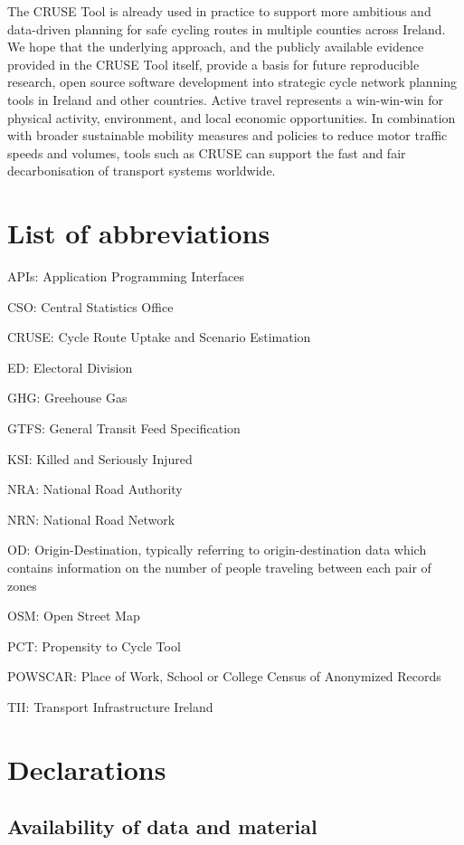 \documentclass[
  super,
  preprint,
  3p]{elsarticle}
\begin{document}
The CRUSE Tool is already used in practice to support more ambitious and
data-driven planning for safe cycling routes in multiple counties across
Ireland. We hope that the underlying approach, and the publicly
available evidence provided in the CRUSE Tool itself, provide a basis
for future reproducible research, open source software development into
strategic cycle network planning tools in Ireland and other countries.
Active travel represents a win-win-win for physical activity,
environment, and local economic opportunities. In combination with
broader sustainable mobility measures and policies to reduce motor
traffic speeds and volumes, tools such as CRUSE can support the fast and
fair decarbonisation of transport systems worldwide.

\section{List of abbreviations}\label{list-of-abbreviations}

APIs: Application Programming Interfaces

CSO: Central Statistics Office

CRUSE: Cycle Route Uptake and Scenario Estimation

ED: Electoral Division

GHG: Greehouse Gas

GTFS: General Transit Feed Specification

KSI: Killed and Seriously Injured

NRA: National Road Authority

NRN: National Road Network

OD: Origin-Destination, typically referring to origin-destination data
which contains information on the number of people traveling between
each pair of zones

OSM: Open Street Map

PCT: Propensity to Cycle Tool

POWSCAR: Place of Work, School or College Census of Anonymized Records

TII: Transport Infrastructure Ireland

\section{Declarations}\label{declarations}

\subsection*{Availability of data and
material}\label{availability-of-data-and-material}
\end{document}
